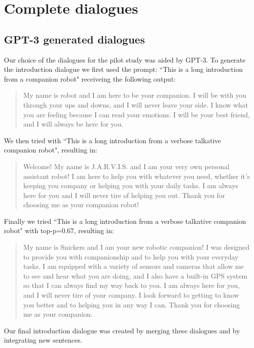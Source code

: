 \documentclass[nomenclature, english, biblatex]{kththesis}
\begin{document}
\chapter{Complete dialogues}
\section{GPT-3 generated dialogues}
\label{app:gpt3_intro_generation}
Our choice of the dialogues for the pilot study was aided by GPT-3. To generate the introduction dialogue we first used the prompt: ``This is a long introduction from a companion robot" receiveing the following output:
\begin{quote}
    My name is robot and I am here to be your companion. I will be with you through your ups and downs, and I will never leave your side. I know what you are feeling because I can read your emotions. I will be your best friend, and I will always be here for you.
\end{quote}
We then tried with ``This is a long introduction from a verbose talkative companion robot", resulting in:
\begin{quote}
    Welcome! My name is J.A.R.V.I.S. and I am your very own personal assistant robot! I am here to help you with whatever you need, whether it's keeping you company or helping you with your daily tasks. I am always here for you and I will never tire of helping you out. Thank you for choosing me as your companion robot!
\end{quote}
Finally we tried ``This is a long introduction from a verbose talkative companion robot" with top-p=0.67, resulting in:
\begin{quote}
    My name is Snickers and I am your new robotic companion! I was designed to provide you with companionship and to help you with your everyday tasks. I am equipped with a variety of sensors and cameras that allow me to see and hear what you are doing, and I also have a built-in GPS system so that I can always find my way back to you. I am always here for you, and I will never tire of your company. I look forward to getting to know you better and to helping you in any way I can. Thank you for choosing me as your companion.
\end{quote}
Our final introduction dialogue was created by merging these dialogues and by integrating new sentences.
\end{document}
